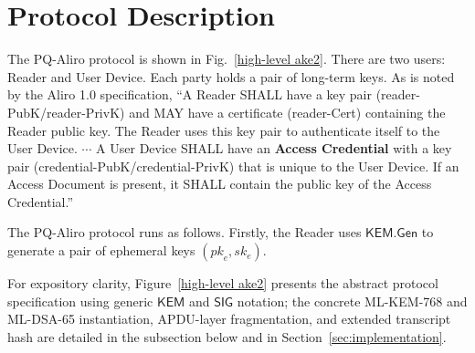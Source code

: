 \documentclass[runningheads]{llncs}
\newcommand{\kem}{\mathsf{KEM}}
\newcommand{\gen}{\mathsf{Gen}}
\begin{document}
\section{Protocol Description}
\label{sec:design:kdf}
The PQ-Aliro protocol is shown in Fig.~\ref{high-level ake2}. There are two users: Reader and User Device. Each party holds a pair of long-term keys.
As is noted by the Aliro 1.0 specification, ``A Reader SHALL have a key pair (reader-PubK/reader-PrivK) and MAY have a certificate (reader-Cert) containing the Reader public key. The Reader uses this key pair to authenticate itself to the User Device. $\cdots$ A User Device SHALL have an {\bf Access Credential} with a key pair (credential-PubK/credential-PrivK) that is unique to the User Device. If an Access Document is present, it SHALL contain the public key of the Access Credential.''

The PQ-Aliro protocol runs as follows.
Firstly, the Reader uses $\kem.\gen$ to generate a pair of ephemeral keys $({pk}_{e}, {sk}_{e})$.

For expository clarity, Figure~\ref{high-level ake2} presents the abstract protocol specification using generic $\mathsf{KEM}$ and $\mathsf{SIG}$ notation; the concrete ML-KEM-768 and ML-DSA-65 instantiation, APDU-layer fragmentation, and extended transcript hash are detailed in the subsection below and in Section~\ref{sec:implementation}.
\end{document}
